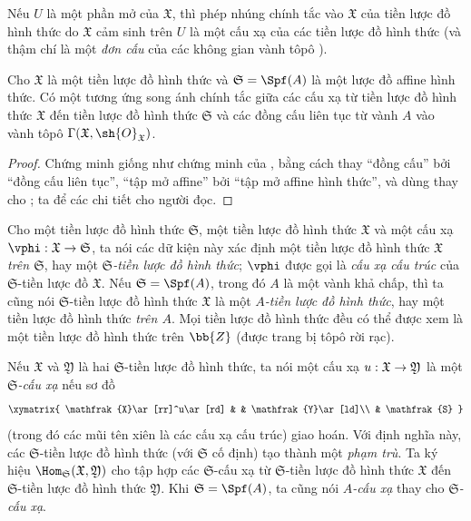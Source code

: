 \documentclass[oneside]{amsart}
\makeatletter
\newcommand{\ega@arrow}[2]{\mathchoice{#1}{#2}{#2}{#2}}
\renewcommand{\to}{\ega@arrow{\longrightarrow}{\rightarrow}}
\newcommand{\oldpage}[2][]{{\marginnote{\normalfont\textbf{#1}~|~#2}}\ignorespaces}
\let\EGAOriginalLabel\label
\renewcommand{\label}[1]{\phantomsection\EGAOriginalLabel{#1}}
\makeatother
\begin{document}
\oldpage[I]{186}
Nếu $U$ là một phần mở của $\mathfrak{X}$, thì phép nhúng chính tắc vào $\mathfrak{X}$ của tiền lược đồ hình thức do $\mathfrak{X}$ cảm sinh trên $U$ là một cấu xạ của các tiền lược đồ hình thức (và thậm chí là một \emph{đơn cấu} của các không gian vành tôpô ).

\begin{proposition}[10.4.6]
\label{I.10.4.6}
Cho $\mathfrak{X}$ là một tiền lược đồ hình thức và $\mathfrak{S}=\Spf(A)$ là một lược đồ affine hình thức.
Có một tương ứng song ánh chính tắc giữa các cấu xạ từ tiền lược đồ hình thức $\mathfrak{X}$ đến tiền lược đồ hình thức $\mathfrak{S}$ và các đồng cấu liên tục từ vành $A$ vào vành tôpô $\Gamma(\mathfrak{X},\sh{O}_\mathfrak{X})$.
\end{proposition}

\begin{proof}
Chứng minh giống như chứng minh của , bằng cách thay ``đồng cấu'' bởi ``đồng cấu liên tục'', ``tập mở affine'' bởi ``tập mở affine hình thức'', và dùng  thay cho ; ta để các chi tiết cho người đọc.
\end{proof}

\begin{env}[10.4.7]
\label{I.10.4.7}
Cho một tiền lược đồ hình thức $\mathfrak{S}$, một tiền lược đồ hình thức $\mathfrak{X}$ và một cấu xạ $\vphi:\mathfrak{X}\to\mathfrak{S}$, ta nói các dữ kiện này xác định một tiền lược đồ hình thức \emph{$\mathfrak{X}$ trên $\mathfrak{S}$}, hay một \emph{$\mathfrak{S}$-tiền lược đồ hình thức}; $\vphi$ được gọi là \emph{cấu xạ cấu trúc} của $\mathfrak{S}$-tiền lược đồ $\mathfrak{X}$.
Nếu $\mathfrak{S}=\Spf(A)$, trong đó $A$ là một vành khả chấp, thì ta cũng nói $\mathfrak{S}$-tiền lược đồ hình thức $\mathfrak{X}$ là một \emph{$A$-tiền lược đồ hình thức}, hay một tiền lược đồ hình thức \emph{trên $A$}.
Mọi tiền lược đồ hình thức đều có thể được xem là một tiền lược đồ hình thức trên $\bb{Z}$ (được trang bị tôpô rời rạc).

Nếu $\mathfrak{X}$ và $\mathfrak{Y}$ là hai $\mathfrak{S}$-tiền lược đồ hình thức, ta nói một cấu xạ $u:\mathfrak{X}\to\mathfrak{Y}$ là một \emph{$\mathfrak{S}$-cấu xạ} nếu sơ đồ
\[
  \xymatrix{
    \mathfrak{X}\ar[rr]^u\ar[rd] & &
    \mathfrak{Y}\ar[ld]\\
    & \mathfrak{S}
  }
\]
(trong đó các mũi tên xiên là các cấu xạ cấu trúc) giao hoán.
Với định nghĩa này, các $\mathfrak{S}$-tiền lược đồ hình thức (với $\mathfrak{S}$ cố định) tạo thành một \emph{phạm trù}.
Ta ký hiệu $\Hom_\mathfrak{S}(\mathfrak{X},\mathfrak{Y})$ cho tập hợp các $\mathfrak{S}$-cấu xạ từ $\mathfrak{S}$-tiền lược đồ hình thức $\mathfrak{X}$ đến $\mathfrak{S}$-tiền lược đồ hình thức $\mathfrak{Y}$.
Khi $\mathfrak{S}=\Spf(A)$, ta cũng nói \emph{$A$-cấu xạ} thay cho \emph{$\mathfrak{S}$-cấu xạ}.
\end{env}
\end{document}
